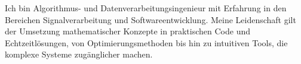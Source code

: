 \textcolor{blocktext1_color}{Ich bin Algorithmus- und Datenverarbeitungsingenieur mit Erfahrung in den Bereichen Signalverarbeitung und Softwareentwicklung. Meine Leidenschaft gilt der Umsetzung mathematischer Konzepte in praktischen Code und Echtzeitlösungen, von Optimierungsmethoden bis hin zu intuitiven Tools, die komplexe Systeme zugänglicher machen.}